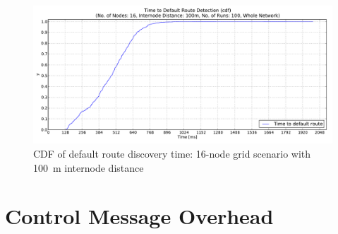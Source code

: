 \begin{figure}[htpb]
  \begin{center}
   \vspace{-20pt}
    \leavevmode
      \includegraphics[scale=0.38]
      {Pics/results/16/MRHOF/grid/dist100_montecarlo_cdf_hist.pdf}
   \caption{CDF of default route discovery time: 16-node grid scenario with 100~m internode distance}
   \end{center}
\end{figure}

\clearpage
\section{Control Message Overhead}
\label{Appx:icmp}

